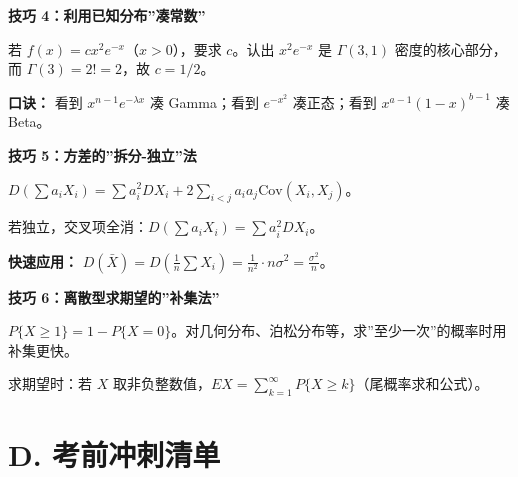 ﻿\documentclass[lang=cn,11pt]{elegantbook}
\begin{document}
\begin{note}
\textbf{技巧 4：利用已知分布”凑常数”}

若 $f(x)=cx^2 e^{-x}$（$x>0$），要求 $c$。认出 $x^2 e^{-x}$ 是 $\Gamma(3,1)$ 密度的核心部分，而 $\Gamma(3)=2!=2$，故 $c=1/2$。

\textbf{口诀：} 看到 $x^{n-1}e^{-\lambda x}$ 凑 Gamma；看到 $e^{-x^2}$ 凑正态；看到 $x^{a-1}(1-x)^{b-1}$ 凑 Beta。
\end{note}

\begin{note}
\textbf{技巧 5：方差的”拆分-独立”法}

$D(\sum a_i X_i)=\sum a_i^2 DX_i + 2\sum_{i<j}a_i a_j\mathrm{Cov}(X_i,X_j)$。

若独立，交叉项全消：$D(\sum a_i X_i)=\sum a_i^2 DX_i$。

\textbf{快速应用：} $D(\bar X)=D\left(\frac{1}{n}\sum X_i\right)=\frac{1}{n^2}\cdot n\sigma^2=\frac{\sigma^2}{n}$。
\end{note}

\begin{note}
\textbf{技巧 6：离散型求期望的”补集法”}

$P\{X\geq 1\}=1-P\{X=0\}$。对几何分布、泊松分布等，求”至少一次”的概率时用补集更快。

求期望时：若 $X$ 取非负整数值，$EX=\sum_{k=1}^\infty P\{X\geq k\}$（尾概率求和公式）。
\end{note}

\section*{D. 考前冲刺清单}
\end{document}
